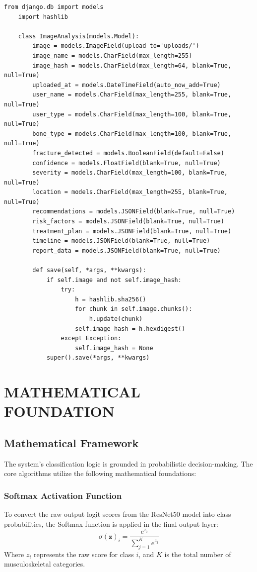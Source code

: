 \documentclass[a4paper,12pt]{report}
\begin{document}
    \begin{lstlisting}[style=pythonstyle]
    from django.db import models
    import hashlib

    class ImageAnalysis(models.Model):
        image = models.ImageField(upload_to='uploads/')
        image_name = models.CharField(max_length=255)
        image_hash = models.CharField(max_length=64, blank=True, null=True)
        uploaded_at = models.DateTimeField(auto_now_add=True)
        user_name = models.CharField(max_length=255, blank=True, null=True)
        user_type = models.CharField(max_length=100, blank=True, null=True)
        bone_type = models.CharField(max_length=100, blank=True, null=True)
        fracture_detected = models.BooleanField(default=False)
        confidence = models.FloatField(blank=True, null=True)
        severity = models.CharField(max_length=100, blank=True, null=True)
        location = models.CharField(max_length=255, blank=True, null=True)
        recommendations = models.JSONField(blank=True, null=True)
        risk_factors = models.JSONField(blank=True, null=True)
        treatment_plan = models.JSONField(blank=True, null=True)
        timeline = models.JSONField(blank=True, null=True)
        report_data = models.JSONField(blank=True, null=True)

        def save(self, *args, **kwargs):
            if self.image and not self.image_hash:
                try:
                    h = hashlib.sha256()
                    for chunk in self.image.chunks():
                        h.update(chunk)
                    self.image_hash = h.hexdigest()
                except Exception:
                    self.image_hash = None
            super().save(*args, **kwargs)
    \end{lstlisting}
    \chapter{MATHEMATICAL FOUNDATION}
    \section{Mathematical Framework}
    The system's classification logic is grounded in probabilistic decision-making. The core algorithms utilize the following mathematical foundations:

    \subsection{Softmax Activation Function}
    To convert the raw output logit scores from the ResNet50 model into class probabilities, the Softmax function is applied in the final output layer:
    \begin{equation}
        \sigma(\mathbf{z})_i = \frac{e^{z_i}}{\sum_{j=1}^K e^{z_j}}
    \end{equation}
    Where $z_i$ represents the raw score for class $i$, and $K$ is the total number of musculoskeletal categories.
\end{document}
